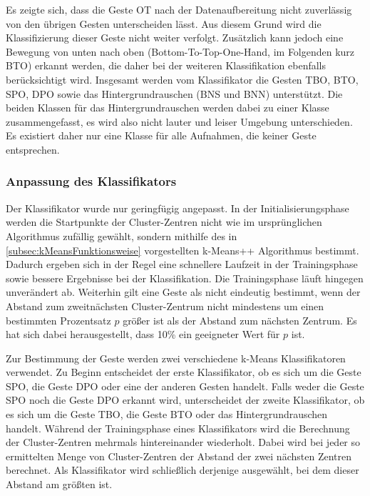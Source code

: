 Es zeigte sich, dass die Geste \ac{OT} nach der Datenaufbereitung nicht zuverlässig von den übrigen Gesten unterscheiden lässt. Aus diesem Grund wird die Klassifizierung dieser Geste nicht weiter verfolgt. Zusätzlich kann jedoch eine Bewegung von unten nach oben (Bottom-To-Top-One-Hand, im Folgenden kurz BTO) erkannt werden, die daher bei der weiteren Klassifikation ebenfalls berücksichtigt wird. Insgesamt werden vom Klassifikator die Gesten \ac{TBO}, BTO, \ac{SPO}, \ac{DPO} sowie das Hintergrundrauschen (\ac{BNS} und \ac{BNN}) unterstützt. Die beiden Klassen für das Hintergrundrauschen werden dabei zu einer Klasse zusammengefasst, es wird also nicht lauter und leiser Umgebung unterschieden. Es existiert daher nur eine Klasse für alle Aufnahmen, die keiner Geste entsprechen.

\subsubsection{Anpassung des Klassifikators}
Der Klassifikator wurde nur geringfügig angepasst.
In der Initialisierungsphase werden die Startpunkte der Cluster-Zentren nicht wie im ursprünglichen Algorithmus zufällig gewählt, sondern mithilfe des in \autoref{subsec:kMeansFunktionsweise} vorgestellten k-Means++ Algorithmus bestimmt.
Dadurch ergeben sich in der Regel eine schnellere Laufzeit in der Trainingsphase sowie bessere Ergebnisse bei der Klassifikation.
Die Trainingsphase läuft hingegen unverändert ab.
Weiterhin gilt eine Geste als nicht eindeutig bestimmt, wenn der Abstand zum zweitnächsten Cluster-Zentrum nicht mindestens um einen bestimmten Prozentsatz $p$ größer ist als der Abstand zum nächsten Zentrum. Es hat sich dabei herausgestellt, dass 10\% ein geeigneter Wert für $p$ ist.


Zur Bestimmung der Geste werden zwei verschiedene k-Means Klassifikatoren verwendet. Zu Beginn entscheidet der erste Klassifikator, ob es sich um die Geste \ac{SPO}, die Geste \ac{DPO} oder eine der anderen Gesten handelt.
Falls weder die Geste \ac{SPO} noch die Geste \ac{DPO} erkannt wird, unterscheidet der zweite Klassifikator, ob es sich um die Geste \ac{TBO}, die Geste BTO oder das Hintergrundrauschen handelt. 
Während der Trainingsphase eines Klassifikators wird die Berechnung der Cluster-Zentren mehrmals hintereinander wiederholt. Dabei wird bei jeder so ermittelten Menge von Cluster-Zentren der Abstand der zwei nächsten Zentren berechnet. Als Klassifikator wird schließlich derjenige ausgewählt, bei dem dieser Abstand am größten ist.


